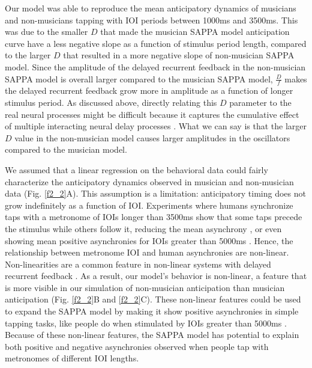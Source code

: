 \documentclass{report}
\begin{document}
Our model was able to reproduce the mean anticipatory dynamics of musicians and non-musicians tapping with IOI periods between 1000ms and 3500ms. This was due to the smaller $D$ that made the musician SAPPA model anticipation curve have a less negative slope as a function of stimulus period length, compared to the larger $D$ that resulted in a more negative slope of non-musician SAPPA model. Since the amplitude of the delayed recurrent feedback in the non-musician SAPPA model is overall larger compared to the musician SAPPA model, $\frac{D}{f}$ makes the delayed recurrent feedback grow more in amplitude as a function of longer stimulus period. As discussed above, directly relating this $D$ parameter to the real neural processes might be difficult because it captures the cumulative effect of multiple interacting neural delay processes \cite{van2003self}. What we can say is that the larger $D$ value in the non-musician model causes larger amplitudes in the oscillators compared to the musician model.

We assumed that a linear regression on the behavioral data could fairly characterize the anticipatory dynamics observed in musician and non-musician data (Fig.{} \ref{f2_2}A). This assumption is a limitation: anticipatory timing does not grow indefinitely as a function of IOI. Experiments where humans synchronize taps with a metronome of IOIs longer than 3500ms show that some taps precede the stimulus while others follow it, reducing the mean asynchrony \cite{baaaath2016estimating}, or even showing mean positive asynchronies for IOIs greater than 5000ms \cite{miyake2004two}. Hence, the relationship between metronome IOI and human asynchronies are non-linear. Non-linearities are a common feature in non-linear systems with delayed recurrent feedback \cite{khalil2002nonlinear}. As a result, our model's behavior is non-linear, a feature that is more visible in our simulation of non-musician anticipation than musician anticipation (Fig.{} \ref{f2_2}B and \ref{f2_2}C). These non-linear features could be used to expand the SAPPA model by making it show positive asynchronies in simple tapping tasks, like people do when stimulated by IOIs greater than 5000ms \cite{miyake2004two}. Because of these non-linear features, the SAPPA model has potential to explain both positive and negative asynchronies observed when people tap with metronomes of different IOI lengths.
\end{document}
